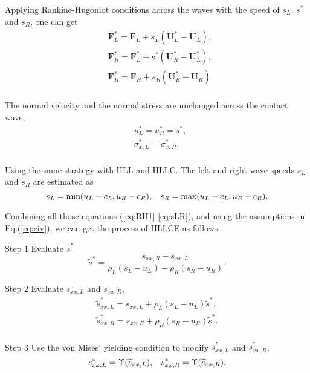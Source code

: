 \documentclass{article}
\theoremstyle{plain}\newtheorem{definition}{\sc{Definition}}
\theoremstyle{defination}\newtheorem{example}{Example}[section]
\numberwithin{equation}{section}
\numberwithin{table}{section}
\begin{document}
  Applying Rankine-Hugoniot conditions across the waves  with the speed of $s_L$, $s^*$ and $s_R$, one can  get 
	\begin{align}
	  &\bm{F}_L^* = \bm{F}_L+s_L (\bm{U}_L^*-\bm{U}_L),\\ \label{eq:RH1}
	&\bm{F}_R^* = \bm{F}_L^*+s^*(\bm{U}_R^*-\bm{U}_L^*),\\
	&\bm{F}_R^* = \bm{F}_R+s_R(\bm{U}_R^*-\bm{U}_R).\\
  \end{align}

  The normal velocity and the normal stress  are unchanged across the contact wave,
	\begin{align}
	  & u_L^* = u_R^* =s^*,\\
	  & \sigma_{x,L}^* = \sigma_{x,R}^* .\\
	\end{align}

	Using the same strategy with HLL and HLLC. The left and right wave speeds $s_L$ and $s_R$ are estimated as
	\begin{equation}\label{eq:sLR}
	  s_L = \text{min} (u_L-c_L, u_R-c_R), \hspace{0.3cm} s_R = \text{max}(u_L+c_L, u_R+c_R).
	\end{equation}

	Combining all those equations (\ref{eq:RH1}-\ref{eq:sLR}), and using the assumptions in Eq.(\ref{eq:eiv}), we can get the process of HLLCE as follows.

	  Step 1 Evaluate  $\widetilde{s}^*$
\begin{equation}
  \widetilde{s}^* = \frac{s_{xx,R}- s_{xx,L}}{\rho_L(s_L-u_L)-\rho_R(s_R-u_R)}.
\end{equation}

Step 2 Evaluate $s_{xx,L}$ and $s_{xx,R}$,
\begin{align}
\widetilde{s}_{xx,L}^* = s_{xx,L} + \rho_L(s_L-u_L) \widetilde{s}^*,\\
\widetilde{s}_{xx,R}^* = s_{xx,R} + \rho_R(s_R-u_R) \widetilde{s}^*.\\
\end{align}

Step 3 Use the von Mises' yielding condition to modify $\widetilde{s}_{xx,L}^*$ and $\widetilde{s}_{xx,R}^*$,
\begin{equation}
  s_{xx,L}^* = \Upsilon(\widetilde{s}_{xx,L}), \hspace{0.3cm}s_{xx,R}^* = \Upsilon(\widetilde{s}_{xx,R}), 
\end{equation}
\end{document}
